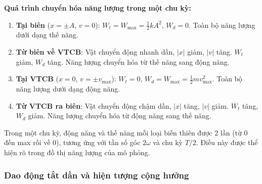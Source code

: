 \begin{enumerate}[label=\alph*)]
    \textbf{Quá trình chuyển hóa năng lượng trong một chu kỳ:}
    \begin{enumerate}
        \item \textbf{Tại biên} ($x = \pm A$, $v = 0$): $W_t = W_{\max} = \frac{1}{2}kA^2$, $W_d = 0$. Toàn bộ năng lượng dưới dạng thế năng.
        \item \textbf{Từ biên về VTCB}: Vật chuyển động nhanh dần, $|x|$ giảm, $|v|$ tăng. $W_t$ giảm, $W_d$ tăng. Năng lượng chuyển hóa từ thế năng sang động năng.
        \item \textbf{Tại VTCB} ($x = 0$, $v = \pm v_{\max}$): $W_t = 0$, $W_d = W_{\max} = \frac{1}{2}m v_{\max}^2$. Toàn bộ năng lượng dưới dạng động năng.
        \item \textbf{Từ VTCB ra biên}: Vật chuyển động chậm dần, $|x|$ tăng, $|v|$ giảm. $W_t$ tăng, $W_d$ giảm. Năng lượng chuyển hóa từ động năng sang thế năng.
    \end{enumerate}

    Trong một chu kỳ, động năng và thế năng mỗi loại biến thiên được 2 lần (từ 0 đến max rồi về 0), tương ứng với tần số góc $2\omega$ và chu kỳ $T/2$. Điều này được thể hiện rõ trong đồ thị năng lượng của mô phỏng.
\end{enumerate}

\subsubsection{Dao động tắt dần và hiện tượng cộng hưởng}

